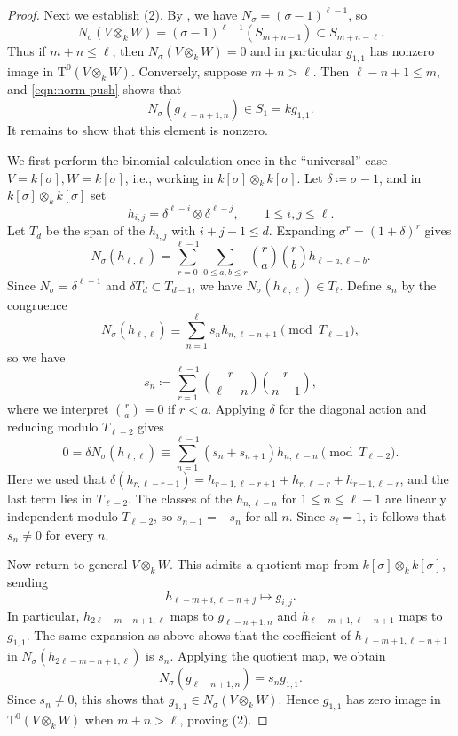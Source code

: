 \documentclass[reqno]{amsart}
\numberwithin{equation}{subsection}
\newcommand{\rT}{\ensuremath{\mathrm{T}}\xspace}
\theoremstyle{remark}
\numberwithin{equation}{subsection}
\numberwithin{figure}{subsection}
\begin{document}
\begin{proof}
Next we establish (2). By \cite[Lemma~3.1.1]{Cot26b}, we have $N_\sigma = (\sigma-1)^{\ell-1}$, so
\begin{equation}\label{eqn:norm-push}
N_\sigma(V \otimes_k W) = (\sigma-1)^{\ell-1}(S_{m+n-1}) \subset S_{m+n-\ell}.
\end{equation}
Thus if $m+n \leq \ell$, then $N_\sigma(V\otimes_k W) = 0$ and in particular $g_{1,1}$ has nonzero image in $\rT^0(V \otimes_k W)$. Conversely, suppose $m+n > \ell$. Then $\ell - n + 1 \leq m$, and \eqref{eqn:norm-push} shows that
\[
N_\sigma(g_{\ell-n+1,n}) \in S_1 = kg_{1,1}.
\]
It remains to show that this element is nonzero.

We first perform the binomial calculation once in the ``universal'' case $V = k[\sigma], W = k[\sigma]$, i.e., working in $k[\sigma]\otimes_k k[\sigma]$. Let $\delta \coloneqq\sigma-1$, and in $k[\sigma]\otimes_k k[\sigma]$ set
\[
h_{i,j}=\delta^{\ell-i}\otimes \delta^{\ell-j}, \qquad 1\leq i,j\leq \ell.
\]
Let $T_d$ be the span of the $h_{i,j}$ with $i+j-1\leq d$. Expanding $\sigma^r=(1+\delta)^r$ gives
\[
N_\sigma(h_{\ell,\ell})
=\sum_{r=0}^{\ell-1}\sum_{0\leq a,b\leq r}{r\choose a}{r\choose b}h_{\ell-a,\ell-b}.
\]
Since $N_\sigma=\delta^{\ell-1}$ and $\delta T_d\subset T_{d-1}$, we have $N_\sigma(h_{\ell,\ell})\in T_\ell$. Define $s_n$ by the congruence
\[
N_\sigma(h_{\ell,\ell})\equiv \sum_{n=1}^{\ell}s_nh_{n,\ell-n+1}\pmod{T_{\ell-1}},
\]
so we have
\[
s_n \coloneqq\sum_{r=1}^{\ell-1}{r\choose \ell-n}{r\choose n-1},
\]
where we interpret ${r\choose a} = 0$ if $r < a$. Applying $\delta$ for the diagonal action and reducing modulo $T_{\ell-2}$ gives
\[
0=\delta N_\sigma(h_{\ell,\ell})
\equiv \sum_{n=1}^{\ell-1}(s_n+s_{n+1})h_{n,\ell-n}
\pmod{T_{\ell-2}}.
\]
Here we used that $\delta(h_{r,\ell-r+1})=h_{r-1,\ell-r+1}+h_{r,\ell-r}+h_{r-1,\ell-r}$, and the last term lies in $T_{\ell-2}$. The classes of the $h_{n,\ell-n}$ for $1\leq n\leq \ell-1$ are linearly independent modulo $T_{\ell-2}$, so $s_{n+1}=-s_n$ for all $n$. Since $s_\ell=1$, it follows that $s_n\neq 0$ for every $n$.

Now return to general $V\otimes_k W$. This admits a quotient map from $k[\sigma]\otimes_k k[\sigma]$, sending
\[
h_{\ell-m+i,\ell-n+j}\longmapsto g_{i,j}.
\]
In particular, $h_{2\ell-m-n+1,\ell}$ maps to $g_{\ell-n+1,n}$ and $h_{\ell-m+1,\ell-n+1}$ maps to $g_{1,1}$. The same expansion as above shows that the coefficient of $h_{\ell-m+1,\ell-n+1}$ in $N_\sigma(h_{2\ell-m-n+1,\ell})$ is $s_n$. Applying the quotient map, we obtain
\[
N_\sigma(g_{\ell-n+1,n})=s_ng_{1,1}.
\]
Since $s_n\neq 0$, this shows that $g_{1,1}\in N_\sigma(V\otimes_k W)$. Hence $g_{1,1}$ has zero image in $\rT^0(V\otimes_k W)$ when $m+n>\ell$, proving (2).


\end{proof}
\end{document}
